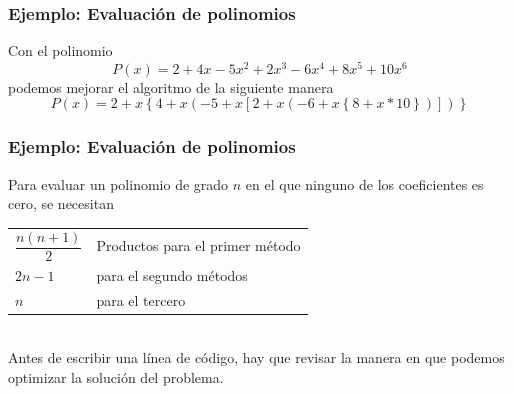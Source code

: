 \begin{frame}
\frametitle{Ejemplo: Evaluación de polinomios}
Con el polinomio
\[ P(x)=2 + 4 x - 5 x^{2} + 2 x^{3} - 6 x^{4} + 8 x^{5} + 10 x^{6}\]
podemos mejorar el algoritmo de la siguiente manera
\fontsize{12}{12}\selectfont
\[ P(x) = 2 + x \left\lbrace 4 + x \left( -5 + x \left[ 2 + x \left(-6 +x \left\lbrace 8+x*10 \right\rbrace \right) \right] \right) \right\rbrace  \]
\end{frame}
\begin{frame}
\frametitle{Ejemplo: Evaluación de polinomios}
Para evaluar un polinomio de grado $n$ en el que ninguno de los coeficientes es cero, se necesitan
\\
\medskip
\pause
\begin{tabular}{l l}
$\dfrac{n(n+1)}{2}$ & Productos para el primer método \\
$2n-1$ & para el segundo métodos \\
$n$ & para el tercero
\end{tabular}
\\
\medskip
\pause
Antes de escribir una línea de código, hay que revisar la manera en que podemos optimizar la solución del problema.
\end{frame}
